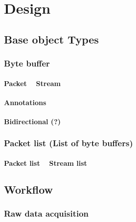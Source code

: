
\chapter{Design}\label{ch:design}
\glsresetall %


\section{Base object Types}

\subsection{Byte buffer}

\subsubsection{Packet ~ Stream}

\subsubsection{Annotations}

\subsubsection{Bidirectional (?)}



\subsection{Packet list (List of byte buffers)}

\subsubsection{Packet list ~ Stream list}




\section{Workflow}

\subsection{Raw data acquisition}


